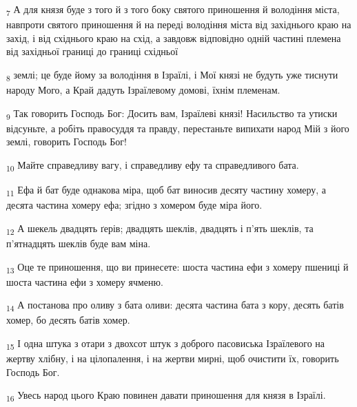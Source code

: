 \begin{tcolorbox}
\textsubscript{7} А для князя буде з того й з того боку святого приношення й володіння міста, навпроти святого приношення й на переді володіння міста від західнього краю на захід, і від східнього краю на схід, а завдовж відповідно одній частині племена від західньої границі до границі східньої
\end{tcolorbox}
\begin{tcolorbox}
\textsubscript{8} землі; це буде йому за володіння в Ізраїлі, і Мої князі не будуть уже тиснути народу Мого, а Край дадуть Ізраїлевому домові, їхнім племенам.
\end{tcolorbox}
\begin{tcolorbox}
\textsubscript{9} Так говорить Господь Бог: Досить вам, Ізраїлеві князі! Насильство та утиски відсуньте, а робіть правосуддя та правду, перестаньте випихати народ Мій з його землі, говорить Господь Бог!
\end{tcolorbox}
\begin{tcolorbox}
\textsubscript{10} Майте справедливу вагу, і справедливу ефу та справедливого бата.
\end{tcolorbox}
\begin{tcolorbox}
\textsubscript{11} Ефа й бат буде однакова міра, щоб бат виносив десяту частину хомеру, а десята частина хомеру ефа; згідно з хомером буде міра його.
\end{tcolorbox}
\begin{tcolorbox}
\textsubscript{12} А шекель двадцять ґерів; двадцять шеклів, двадцять і п'ять шеклів, та п'ятнадцять шеклів буде вам міна.
\end{tcolorbox}
\begin{tcolorbox}
\textsubscript{13} Оце те приношення, що ви принесете: шоста частина ефи з хомеру пшениці й шоста частина ефи з хомеру ячменю.
\end{tcolorbox}
\begin{tcolorbox}
\textsubscript{14} А постанова про оливу з бата оливи: десята частина бата з кору, десять батів хомер, бо десять батів хомер.
\end{tcolorbox}
\begin{tcolorbox}
\textsubscript{15} І одна штука з отари з двохсот штук з доброго пасовиська Ізраїлевого на жертву хлібну, і на цілопалення, і на жертви мирні, щоб очистити їх, говорить Господь Бог.
\end{tcolorbox}
\begin{tcolorbox}
\textsubscript{16} Увесь народ цього Краю повинен давати приношення для князя в Ізраїлі.
\end{tcolorbox}
